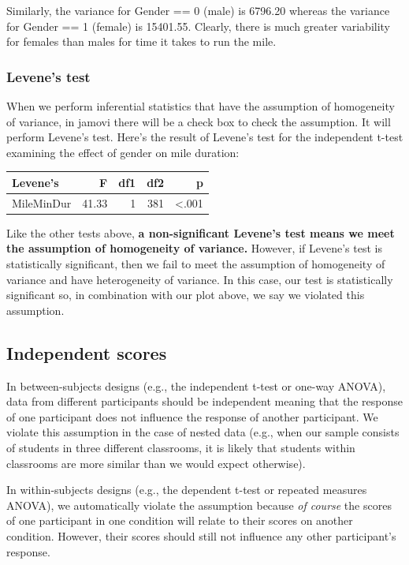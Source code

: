 \documentclass[
]{book}
\begin{document}
Similarly, the variance for Gender == 0 (male) is 6796.20 whereas the variance for Gender == 1 (female) is 15401.55. Clearly, there is much greater variability for females than males for time it takes to run the mile.

\hypertarget{levenes-test}{%
\subsubsection{Levene's test}\label{levenes-test}}

When we perform inferential statistics that have the assumption of homogeneity of variance, in jamovi there will be a check box to check the assumption. It will perform Levene's test. Here's the result of Levene's test for the independent t-test examining the effect of gender on mile duration:

\begin{longtable}[]{@{}lrrrr@{}}
\toprule
Levene's & F & df1 & df2 & p \\
\midrule
\endhead
MileMinDur & 41.33 & 1 & 381 & \textless.001 \\
\bottomrule
\end{longtable}

Like the other tests above, \textbf{a non-significant Levene's test means we meet the assumption of homogeneity of variance.} However, if Levene's test is statistically significant, then we fail to meet the assumption of homogeneity of variance and have heterogeneity of variance. In this case, our test is statistically significant so, in combination with our plot above, we say we violated this assumption.

\hypertarget{independent-scores}{%
\subsection{Independent scores}\label{independent-scores}}

In between-subjects designs (e.g., the independent t-test or one-way ANOVA), data from different participants should be independent meaning that the response of one participant does not influence the response of another participant. We violate this assumption in the case of nested data (e.g., when our sample consists of students in three different classrooms, it is likely that students within classrooms are more similar than we would expect otherwise).

In within-subjects designs (e.g., the dependent t-test or repeated measures ANOVA), we automatically violate the assumption because \emph{of course} the scores of one participant in one condition will relate to their scores on another condition. However, their scores should still not influence any other participant's response.
\end{document}
